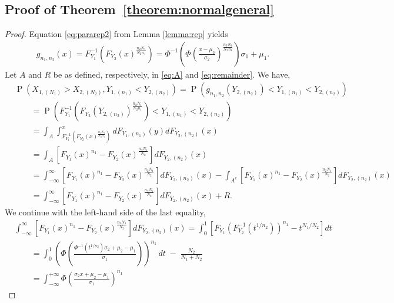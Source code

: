 \documentclass[12pt]{article}
\DeclareMathOperator*{\Prob}{P}
\begin{document}
\subsection{Proof of Theorem~\ref{theorem:normalgeneral}}

\begin{proof}
Equation \ref{eq:pararep2} from Lemma \ref{lemma:rep} yields
\begin{align*}
	g_{n_1, n_2}(x) = F_{Y_1}^{-1}\left(F_{Y_2}(x)^{\frac{n_2N_1}{N_2n_1}}\right) = \Phi^{-1}\left(\Phi\left(\frac{x-\mu_2}{\sigma_2}\right)^\frac{n_2N_1}{N_2n_1}\right)\sigma_1 +\mu_1.
\end{align*}
Let $A$ and $R$ be as defined, respectively, in \eqref{eq:A} and \eqref{eq:remainder}. We have,
\begin{align*}
  &\Prob\left(X_{1,(N_1)} > X_{2,(N_2)}, Y_{1,(n_1)} < Y_{2,(n_2)}\right) = \Prob\left( g_{n_1,n_2}\left(Y_{2,(n_2)}\right) < Y_{1,(n_1)}  < Y_{2,(n_2)}\right)\\
	&\qquad= \Prob\left( F_{Y_1}^{-1}\left(F_{Y_2}(Y_{2,(n_2)})^{\frac{n_2N_1}{N_2n_1}}\right) < Y_{1,(n_1)}  < Y_{2,(n_2)}\right)\\
	&\qquad= \int_A \int_{F_{Y_1}^{-1}\left(F_{Y_2}(x)^{\frac{n_2N_1}{N_2n_1}}\right)}^{x} d F_{Y_1, (n_1)}(y) d F_{Y_2, (n_2)}(x)\\	
	&\qquad= \int_{A}\left[ F_{Y_1}(x)^{n_1} - F_{Y_2}(x)^{\frac{n_2N_1}{N_2}}\right]d F_{Y_2, (n_2)}(x) \\
	&\qquad= \int_{-\infty}^{\infty} \left[F_{Y_1}(x)^{n_1} - F_{Y_2}(x)^{\frac{n_2N_1}{N_2}}\right]d F_{Y_2, (n_2)}(x) - \int_{A^c} \left[F_{Y_1}(x)^{n_1} - F_{Y_2}(x)^{\frac{n_2N_1}{N_2}}\right]d F_{Y_2, (n_2)}(x) \\
	&\qquad= \int_{-\infty}^{\infty}\left[ F_{Y_1}(x)^{n_1} - F_{Y_2}(x)^{\frac{n_2N_1}{N_2}}\right]d F_{Y_2, (n_2)}(x) + R.
\end{align*}
We continue with the left-hand side of the last equality,	
\begin{align*}
&\int_{-\infty}^{\infty} \left[ F_{Y_1}(x)^{n_1} - F_{Y_2}(x)^{\frac{n_2N_1}{N_2}} \right] d F_{Y_2,(n_2)}(x) 
= \int_0^1 \left[ F_{Y_1}\!\left( F_{Y_2}^{-1}(t^{1/n_2}) \right)^{n_1} - t^{N_1/N_2} \right] dt\\[6pt]
&\qquad= \int_{0}^{1} \left( \Phi\!\left(\frac{\Phi^{-1}(t^{1/n_2})\sigma_2 + \mu_2 - \mu_1}{\sigma_1}\right) \right)^{n_1} \, dt \;-\; \frac{N_2}{N_1 + N_2} \\[6pt]
&\qquad= \int_{-\infty}^{+\infty} 
\Phi\!\left(\frac{\sigma_2 x + \mu_2 - \mu_1}{\sigma_1}\right)^{n_1} 

\end{align*}
\end{proof}
\end{document}
